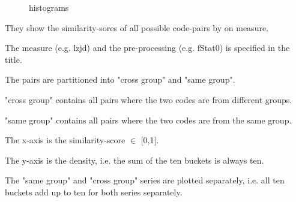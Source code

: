 \documentclass[../main.tex]{subfiles}
\begin{document}
\begin{figure}[ht!]
  \centering

  \caption{histograms}
  \label{fig:histograms}
\end{figure}

\begin{ul}
  \item They show the similarity-sores of all possible code-pairs by on measure.
  \item The measure (e.g. lzjd) and the pre-processing (e.g. fStat0) is specified in the title.
  \item The pairs are partitioned into "cross group" and "same group".
  \item "cross group" contains all pairs where the two codes are from different groups.
  \item "same group" contains all pairs where the two codes are from the same group.
  \item The x-axis is the similarity-score \(\in\) [0,1].
  \item The y-axis is the density, i.e. the sum of the ten buckets is always ten.
  \item The "same group" and "cross group" series are plotted separately, i.e. all ten buckets add up to ten for both series separately.
\end{ul}
\end{document}
